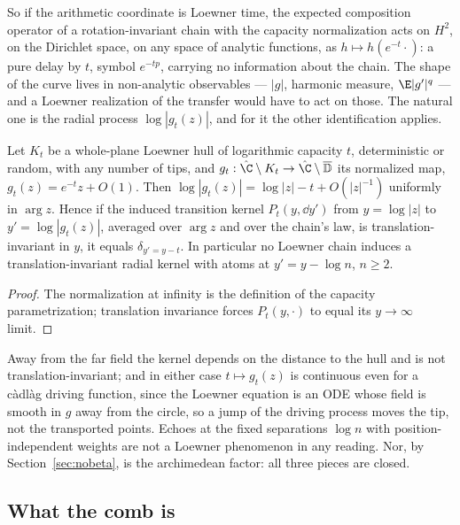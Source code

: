 So if the arithmetic coordinate is Loewner time, the expected composition
operator of a rotation-invariant chain with the capacity normalization acts on
$H^2$, on the Dirichlet space, on any space of analytic functions, as
$h\mapsto h(e^{-t}\cdot)$: a pure delay by $t$, symbol $e^{-tp}$, carrying no
information about the chain. The shape of the curve lives in non-analytic
observables --- $|g|$, harmonic measure, $\E|g'|^q$ --- and a Loewner
realization of the transfer would have to act on those. The natural one is the
radial process $\log|g_t(z)|$, and for it the other identification applies.

\begin{proposition}\label{prop:farfield}
Let $K_t$ be a whole-plane Loewner hull of logarithmic capacity $t$,
deterministic or random, with any number of tips, and
$g_t:\hat\C\setminus K_t\to\hat\C\setminus\overline{\mathbb D}$ its normalized
map, $g_t(z)=e^{-t}z+O(1)$. Then $\log|g_t(z)|=\log|z|-t+O(|z|^{-1})$ uniformly
in $\arg z$. Hence if the induced transition kernel $P_t(y,\dd y')$ from
$y=\log|z|$ to $y'=\log|g_t(z)|$, averaged over $\arg z$ and over the chain's
law, is translation-invariant in $y$, it equals $\delta_{y'=y-t}$. In
particular no Loewner chain induces a translation-invariant radial kernel with
atoms at $y'=y-\log n$, $n\geq2$.
\end{proposition}
\begin{proof}
The normalization at infinity is the definition of the capacity
parametrization; translation invariance forces $P_t(y,\cdot)$ to equal its
$y\to\infty$ limit.
\end{proof}

Away from the far field the kernel depends on the distance to the hull and is
not translation-invariant; and in either case $t\mapsto g_t(z)$ is continuous
even for a c\`adl\`ag driving function, since the Loewner equation is an ODE
whose field is smooth in $g$ away from the circle, so a jump of the driving
process moves the tip, not the transported points. Echoes at the fixed
separations $\log n$ with position-independent weights are not a Loewner
phenomenon in any reading. Nor, by Section~\ref{sec:nobeta}, is the archimedean
factor: all three pieces are closed.

\subsection{What the comb is}\label{sec:hecke}

